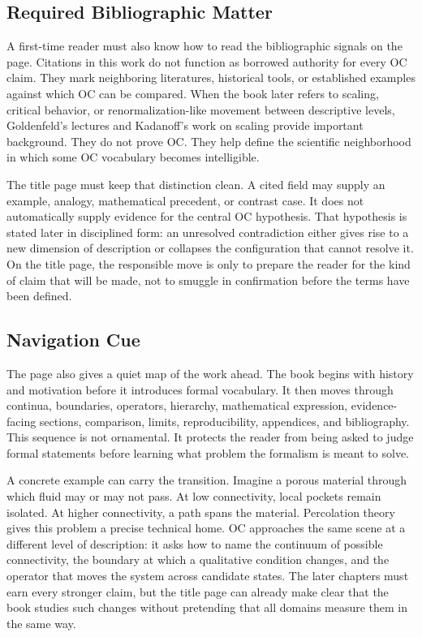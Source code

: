 \documentclass[11pt,a4paper,openany]{book}
\begin{document}
\subsection{Required Bibliographic Matter}
A first-time reader must also know how to read the bibliographic signals on the page. Citations in this work do not function as borrowed authority for every OC claim. They mark neighboring literatures, historical tools, or established examples against which OC can be compared. When the book later refers to scaling, critical behavior, or renormalization-like movement between descriptive levels, Goldenfeld's lectures and Kadanoff's work on scaling provide important background. They do not prove OC. They help define the scientific neighborhood in which some OC vocabulary becomes intelligible. \cite{stauffer_percolation,grimmett_percolation}\par
The title page must keep that distinction clean. A cited field may supply an example, analogy, mathematical precedent, or contrast case. It does not automatically supply evidence for the central OC hypothesis. That hypothesis is stated later in disciplined form: an unresolved contradiction either gives rise to a new dimension of description or collapses the configuration that cannot resolve it. On the title page, the responsible move is only to prepare the reader for the kind of claim that will be made, not to smuggle in confirmation before the terms have been defined.\par
\subsection{Navigation Cue}
The page also gives a quiet map of the work ahead. The book begins with history and motivation before it introduces formal vocabulary. It then moves through continua, boundaries, operators, hierarchy, mathematical expression, evidence-facing sections, comparison, limits, reproducibility, appendices, and bibliography. This sequence is not ornamental. It protects the reader from being asked to judge formal statements before learning what problem the formalism is meant to solve. \cite{stauffer_percolation,grimmett_percolation}\par
A concrete example can carry the transition. Imagine a porous material through which fluid may or may not pass. At low connectivity, local pockets remain isolated. At higher connectivity, a path spans the material. Percolation theory gives this problem a precise technical home. OC approaches the same scene at a different level of description: it asks how to name the continuum of possible connectivity, the boundary at which a qualitative condition changes, and the operator that moves the system across candidate states. The later chapters must earn every stronger claim, but the title page can already make clear that the book studies such changes without pretending that all domains measure them in the same way.\par
\end{document}
